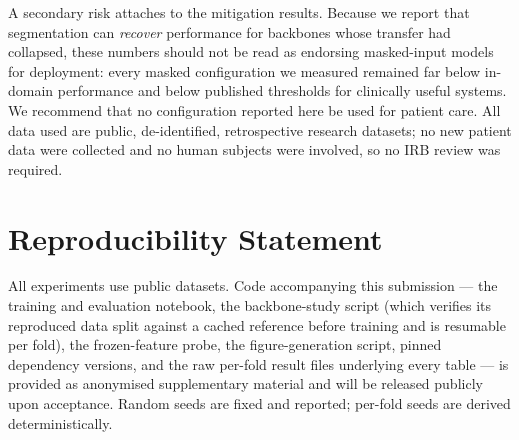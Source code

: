 \documentclass{article}
\newif\ifnamedbuild
\begin{document}
A secondary risk attaches to the mitigation results. Because we report that segmentation can
\emph{recover} performance for backbones whose transfer had collapsed, these numbers should not be
read as endorsing masked-input models for deployment: every masked configuration we measured
remained far below in-domain performance and below published thresholds for clinically useful
systems. We recommend that no configuration reported here be used for patient care. All data used
are public, de-identified, retrospective research datasets; no new patient data were collected and
no human subjects were involved, so no IRB review was required.

\ifnamedbuild
\section*{Reproducibility Statement}

All experiments use public datasets and are reproducible from the released code. The repository
contains the training and evaluation notebook, the backbone-study script (which verifies its
reproduced data split against a cached reference before training and is resumable per fold), the
frozen-feature probe, the figure-generation script, pinned dependency versions, and the raw
per-fold result files underlying every table. Random seeds are fixed and reported; per-fold seeds
are derived deterministically. Code: \url{https://github.com/alvinchow97/tb-xray-analysis}.
\else
\section*{Reproducibility Statement}

All experiments use public datasets. Code accompanying this submission --- the training and
evaluation notebook, the backbone-study script (which verifies its reproduced data split against a
cached reference before training and is resumable per fold), the frozen-feature probe, the
figure-generation script, pinned dependency versions, and the raw per-fold result files underlying
every table --- is provided as anonymised supplementary material and will be released publicly upon
acceptance. Random seeds are fixed and reported; per-fold seeds are derived deterministically.
\fi



\end{document}
